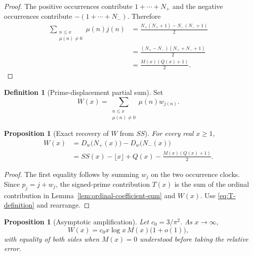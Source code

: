 \documentclass[11pt]{amsart}
\numberwithin{equation}{section}
\theoremstyle{plain}
\newtheorem{proposition}[theorem]{Proposition}
\theoremstyle{definition}
\newtheorem{definition}[theorem]{Definition}
\theoremstyle{remark}
\begin{document}
\begin{proof}
The positive occurrences contribute $1+\cdots+N_+$ and the negative
occurrences contribute $-(1+\cdots+N_-)$.  Therefore
\begin{align}
\sum_{\substack{n\le x\\ \mu(n)\ne0}}\mu(n)j(n)
&=\frac{N_+(N_++1)-N_-(N_-+1)}2
\label{eq:ordinal-sum-first}\\
&=\frac{(N_+-N_-)(N_++N_-+1)}2
\label{eq:ordinal-sum-second}\\
&=\frac{M(x)(Q(x)+1)}2.
\label{eq:ordinal-sum-third}
\end{align}
\end{proof}

\begin{definition}[Prime-displacement partial sum]
\label{def:W-partial-sum}
Set
\begin{equation}
W(x)=\sum_{\substack{n\le x\\ \mu(n)\ne0}}
\mu(n)w_{j(n)}.
\label{eq:W-definition}
\end{equation}
\end{definition}

\begin{proposition}[Exact recovery of $W$ from $SS$]
\label{prop:W-from-SS}
For every real $x\ge1$,
\begin{align}
W(x)&=D_w\bigl(N_+(x)\bigr)-D_w\bigl(N_-(x)\bigr)
\label{eq:W-Dw}\\
&=SS(x)-\lfloor x\rfloor+Q(x)
-\frac{M(x)(Q(x)+1)}2.
\label{eq:W-SS}
\end{align}
\end{proposition}

\begin{proof}
The first equality follows by summing $w_j$ on the two occurrence clocks.
Since $p_j=j+w_j$, the signed-prime contribution $T(x)$ is the sum of the
ordinal contribution in Lemma~\ref{lem:ordinal-coefficient-sum} and $W(x)$.
Use \eqref{eq:T-definition} and rearrange.
\end{proof}

\begin{proposition}[Asymptotic amplification]
\label{prop:W-asymptotic}
Let $c_0=3/\pi^2$.  As $x\to\infty$,
\begin{equation}
W(x)=c_0x\log x\,M(x)\bigl(1+o(1)\bigr),
\label{eq:W-asymptotic}
\end{equation}
with equality of both sides when $M(x)=0$ understood before taking the
relative error.
\end{proposition}
\end{document}
